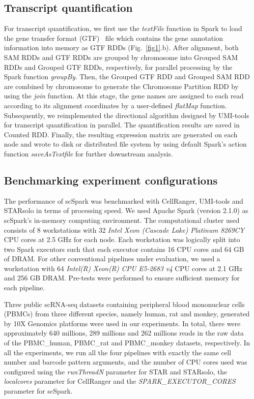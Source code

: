 \documentclass[conference]{IEEEtran}
\begin{document}
\subsection{Transcript quantification}
For transcript quantification, we first use the \textit{textFile} function in Spark to load the gene transfer format (GTF)~\cite{breese2013ngsutils} file which contains the gene annotation information into memory as GTF RDDs (Fig.~\ref{fig1}.b). 
After alignment, both SAM RDDs and GTF RDDs are grouped by chromosome into Grouped SAM RDDs and Grouped GTF RDDs, respectively, for parallel processing by the Spark function \textit{groupBy}. 
Then, the Grouped GTF RDD and Grouped SAM RDD are combined by chromosome to generate the Chromosome Partition RDD by using the \textit{join} function.
At this stage, the gene names are assigned to each read according to its alignment coordinates by a user-defined \textit{flatMap} function. 
Subsequently, we reimplemented the directional algorithm designed by UMI-tools for transcript quantification in parallel. The quantification results are saved in Counted RDD.
Finally, the resulting expression matrix are generated on each node and wrote to disk or distributed file system by using default Spark's action function \textit{saveAsTextfile} for further downstream analysis. 

\subsection{Benchmarking experiment configurations}
The performance of scSpark was benchmarked with CellRanger, UMI-tools and STARsolo in terms of processing speed. 
We used Apache Spark (version 2.1.0) as scSpark's in-memory computing environment.
The computational cluster used consists of 8 workstations with 32 \textit{Intel Xeon (Cascade Lake) Platinum 8269CY} CPU cores at 2.5 GHz for each node. 
Each workstation was logically split into two Spark executors such that each executor contains 16 CPU cores and 64 GB of DRAM.
For other conventional pipelines under evaluation, we used a workstation with 64 \textit{Intel(R) Xeon(R) CPU E5-2683 v4} CPU cores at 2.1 GHz and 256 GB DRAM. Pre-tests were performed to ensure sufficient memory for each pipeline.

Three public scRNA-seq datasets containing peripheral blood mononuclear cells (PBMCs) from three different species, namely human, rat and monkey, generated by 10X Genomics platforms were used in our experiments. 
In total, there were approximately 640 millions, 289 millions and 262 millions reads in the raw data of the PBMC\_human, PBMC\_rat and PBMC\_monkey datasets, respectively. 
In all the experiments, we run all the four pipelines with exactly the same cell number and barcode pattern arguments, and the number of CPU cores used was configured using the \textit{runThreadN} parameter for STAR and STARsolo, the \textit{localcores} parameter for CellRanger and the \textit{SPARK\_EXECUTOR\_CORES} parameter for scSpark.
\end{document}
